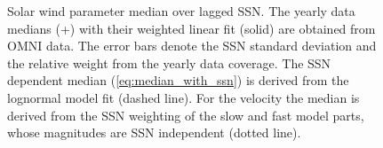 \begin{figure}
	\caption{Solar wind parameter median over lagged SSN. The yearly data medians (+) with their weighted linear fit (solid) are obtained from OMNI data. The error bars denote the SSN standard deviation and the relative weight from the yearly data coverage. The SSN dependent median (\ref{eq:median_with_ssn}) is derived from the lognormal model fit (dashed line). For the velocity the median is derived from the SSN weighting of the slow and fast model parts, whose magnitudes are SSN independent (dotted line).}
	\label{fig:OMNI_yearly_BVNTvsSSN_a}
\end{figure}

